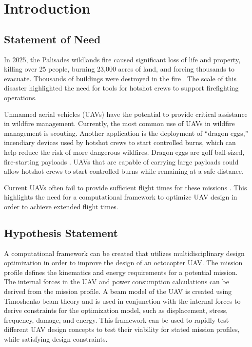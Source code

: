 \documentclass[doublespace,nopageskip]{VTthesis}
\begin{document}
	\chapter{Introduction} \label{ch:introduction}
		\section{Statement of Need}
		
			In 2025, the Palisades wildlands fire caused significant loss of life and property, killing over 25 people, burning 23,000 acres of land, and forcing thousands to evacuate. Thousands of buildings were destroyed in the fire \cite{nyt_fire}. The scale of this disaster highlighted the need for tools for hotshot crews to support firefighting operations. 
		 
			Unmanned aerial vehicles (UAVs) have the potential to provide critical assistance in wildfire management. Currently, the most common use of UAVs in wildfire management is scouting. Another application is the deployment of “dragon eggs,” incendiary devices used by hotshot crews to start controlled burns, which can help reduce the risk of more dangerous wildfires. Dragon eggs are golf ball-sized, fire-starting payloads \cite{Education}.  UAVs that are capable of carrying large payloads could allow hotshot crews to start controlled burns while remaining at a safe distance. 
			
		 	Current UAVs often fail to provide sufficient flight times for these missions \cite{drones5010015}. This highlights the need for a computational framework to optimize UAV design in order to achieve extended flight times.
		 	
		 	
		 \section{Hypothesis Statement}

		 	
		 	A computational framework can be created that utilizes multidisciplinary design optimization in order to improve the design of an octocopter UAV. The mission profile defines the kinematics and energy requirements for a potential mission. The internal forces in the UAV and power consumption calculations can be derived from the mission profile. A beam model of the UAV is created using Timoshenko beam theory and is used in conjunction with the internal forces to derive constraints for the optimization model, such as displacement, stress, frequency, damage, and energy. This framework can be used to rapidly test different UAV design concepts to test their viability for stated mission profiles, while satisfying design constraints. 
		 
\end{document}
